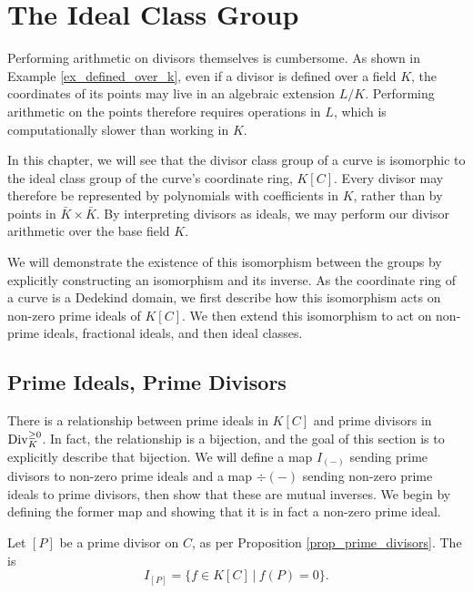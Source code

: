 
\section{The Ideal Class Group}
\label{chap_ideals}

Performing arithmetic on divisors themselves is cumbersome.
As shown in Example \ref{ex_defined_over_k},
even if a divisor is defined over a field $K$,
the coordinates of its points may live in an algebraic extension $L/K$.
Performing arithmetic on the points therefore requires operations in $L$,
which is computationally slower than working in $K$.

In this chapter, we will see that the divisor class group of a curve
is isomorphic to the ideal class group of the curve's coordinate ring, $K[C]$.
Every divisor may therefore be represented by polynomials with coefficients in $K$,
rather than by points in $\bar K \times \bar K$.
By interpreting divisors as ideals,
we may perform our divisor arithmetic over the base field $K$.

We will demonstrate the existence of this isomorphism between the groups
by explicitly constructing an isomorphism and its inverse.
As the coordinate ring of a curve is a Dedekind domain,
we first describe how this isomorphism acts on non-zero prime ideals of $K[C]$.
We then extend this isomorphism to act on non-prime ideals, fractional ideals, and then ideal classes.



\subsection{Prime Ideals, Prime Divisors}

There is a relationship between prime ideals in $K[C]$ and prime divisors in $\operatorname{Div}_K^{\geq 0}$.
In fact, the relationship is a bijection, and the goal of this section is to explicitly describe that bijection.
We will define a map $I_{(-)}$ sending prime divisors to non-zero prime ideals
and a map $\div(-)$ sending non-zero prime ideals to prime divisors, then show that these are mutual inverses.
We begin by defining the former map and showing that it is in fact a non-zero prime ideal.

\begin{definition}
  Let $[P]$ be a prime divisor on $C$, as per Proposition \ref{prop_prime_divisors}.
  The  is
  \[ I_{[P]} = \{ f \in K[C] ~|~ f(P) = 0 \}. \]
\end{definition}

